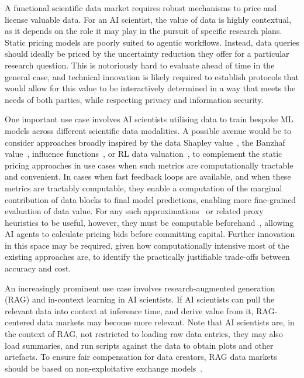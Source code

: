 \documentclass[11pt, a4paper, twocolumn, goog]{google}
\begin{document}
A functional scientific data market requires robust mechanisms to price and license valuable data. For an AI scientist, the value of data is highly contextual, as it depends on the role it may play in the pursuit of specific research plans. Static pricing models are poorly suited to agentic workflows. Instead, data queries should ideally be priced by the uncertainty reduction they offer for a particular research question. This is notoriously hard to evaluate ahead of time in the general case, and technical innovation is likely required to establish protocols that would allow for this value to be interactively determined in a way that meets the needs of both parties, while respecting privacy and information security.

One important use case involves AI scientists utilising data to train bespoke ML models across different scientific data modalities. A possible avenue would be to consider approaches broadly inspired by the data Shapley value~\citep{ghorbani2019data, jia2019towards, tang2021data, tian2022data}, the Banzhaf value~\citep{wang2023data}, influence functions~\citep{koh2017understanding}, or RL data valuation~\citep{yoon2020data}, to complement the static pricing approaches in use cases when such metrics are computationally tractable and convenient. In cases when fast feedback loops are available, and when these metrics are tractably computable, they enable a computation of the marginal contribution of data blocks to final model predictions, enabling more fine-grained evaluation of data value. For any such approximations~\citep{jia2019towards, garrido2024shapley} or related proxy heuristics to be useful, however, they must be computable beforehand~\citep{navia2025priori}, allowing AI agents to calculate pricing bids before committing capital. Further innovation in this space may be required, given how computationally intensive most of the existing approaches are, to identify the practically justifiable trade-offs between accuracy and cost.

An increasingly prominent use case involves research-augmented generation (RAG) and in-context learning in AI scientists. If AI scientists can pull the relevant data into context at inference time, and derive value from it, RAG-centered data markets may become more relevant. Note that AI scientists are, in the context of RAG, not restricted to loading raw data entries, they may also load summaries, and run scripts against the data to obtain plots and other artefacts. To ensure fair compensation for data creators, RAG data markets should be based on non-exploitative exchange models~\citep{zhang2026fairshare}.
\end{document}

